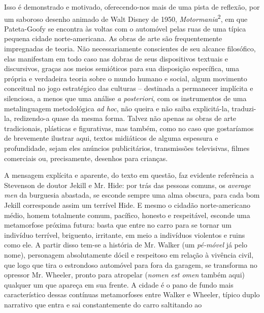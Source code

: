 \begin{multicols}{2}
\par{}Isso é demonstrado e motivado,\allowbreak{} oferecendo-\allowbreak{}nos mais de uma pista de reflexão,\allowbreak{} por um saboroso desenho animado de Walt Disney de 1950,\allowbreak{} \textit{Motormania}\textsuperscript{2},\allowbreak{} em que Pateta-\allowbreak{}Goofy se encontra às voltas com o automóvel pelas ruas de uma típica pequena cidade norte-\allowbreak{}americana.\allowbreak{} As obras de arte são frequentemente impregnadas de teoria.\allowbreak{} Não necessariamente conscientes de seu alcance filosófico,\allowbreak{} elas manifestam em todo caso nas dobras de seus dispositivos textuais e discursivos,\allowbreak{} graças aos meios semióticos para sua disposição específica,\allowbreak{} uma própria e verdadeira teoria sobre o mundo humano e social,\allowbreak{} algum movimento conceitual no jogo estratégico das culturas – destinada a permanecer implícita e silenciosa,\allowbreak{} a menos que uma análise \textit{a posteriori},\allowbreak{} com os instrumentos de uma metalinguagem metodológica \textit{ad hoc},\allowbreak{} não queira e não saiba explicitá-\allowbreak{}la,\allowbreak{} traduzi-\allowbreak{}la,\allowbreak{} redizendo-\allowbreak{}a quase da mesma forma.\allowbreak{} Talvez não apenas as obras de arte tradicionais,\allowbreak{} plásticas e figurativas,\allowbreak{} mas também,\allowbreak{} como no caso que gostaríamos de brevemente ilustrar aqui,\allowbreak{} textos midiáticos de alguma espessura e profundidade,\allowbreak{} sejam eles anúncios publicitários,\allowbreak{} transmissões televisivas,\allowbreak{} filmes comerciais ou,\allowbreak{} precisamente,\allowbreak{} desenhos para crianças.\allowbreak{}\par{}A mensagem explícita e aparente,\allowbreak{} do texto em questão,\allowbreak{} faz evidente referência a Stevenson de doutor Jekill e Mr.\allowbreak{} Hide:\allowbreak{} por trás das pessoas comuns,\allowbreak{} os \textit{average men} da burguesia abastada,\allowbreak{} se esconde sempre uma alma obscura,\allowbreak{} para cada bom Jekill corresponde assim um terrível Hide.\allowbreak{} E mesmo o cidadão norte-\allowbreak{}americano médio,\allowbreak{} homem totalmente comum,\allowbreak{} pacífico,\allowbreak{} honesto e respeitável,\allowbreak{} esconde uma metamorfose próxima futura:\allowbreak{} basta que entre no carro para se tornar um indivíduo terrível,\allowbreak{} briguento,\allowbreak{} irritante,\allowbreak{} em meio a indivíduos violentos e ruins como ele.\allowbreak{} A partir disso tem-\allowbreak{}se a história de Mr.\allowbreak{} Walker (\allowbreak{}um \textit{pé-\allowbreak{}móvel} já pelo nome)\allowbreak{},\allowbreak{} personagem absolutamente dócil e respeitoso em relação à vivência civil,\allowbreak{} que logo que tira o estrondoso automóvel para fora da garagem,\allowbreak{} se transforma no opressor Mr.\allowbreak{} Wheeler,\allowbreak{} pronto para atropelar (\allowbreak{}\textit{nomen est omen} também aqui)\allowbreak{} qualquer um que apareça em sua frente.\allowbreak{} A cidade é o pano de fundo mais característico dessas contínuas metamorfoses entre Walker e Wheeler,\allowbreak{} típico duplo narrativo que entra e sai constantemente do carro saltitando ao 
\end{multicols}
